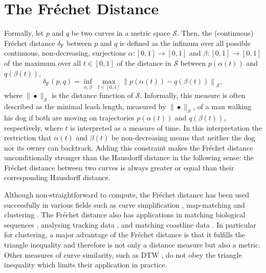 \section{The Fr\'echet Distance}
\label{sec:frechet}
Formally, let $p$ and $q$ be two curves in a metric space $\mathcal{S}$.
Then, the (continuous) Fr\'echet distance $\delta_\mathrm{F}$ between $p$ and $q$ is defined as the infimum over all possible continuous, non-decreasing, surjections $\alpha: [0, 1] \to [0, 1]$ and $\beta: [0, 1] \to [0, 1]$ of the maximum over all $t \in [0, 1]$ of the distance in $\mathcal{S}$ between $p(\alpha(t))$ and $q(\beta(t))$,
\begin{equation*}
    \delta_\mathrm{F}(p, q) = \inf_{\alpha,\beta} \; \max_{t \in [0, 1]} \left\| p(\alpha(t)) - q(\beta(t)) \right\|_\mathcal{S},
\end{equation*}
where $\| \bullet \|_\mathcal{S}$ is the distance function of $\mathcal{S}$.
Informally, this measure is often described as the minimal leash length, measured by $\| \bullet \|_\mathcal{S}$, of a man walking his dog if both are moving on trajectories $p(\alpha(t))$ and $q(\beta(t))$, respectively, where $t$ is interpreted as a measure of time.
In this interpretation the restriction that $\alpha(t)$ and $\beta(t)$ be non-decreasing means that neither the dog nor its owner can backtrack.
Adding this constraint makes the Fr\'echet distance unconditionally stronger than the Hausdorff distance in the following sense: the Fr\'echet distance between two curves is always greater or equal than their corresponding Hausdorff distance.

Although non-straightforward to compute, the Fr\'echet distance has been used successfully in various fields such as curve simplification \citep{agarwal05,bereg08,kreveld18,kerkhof19}, map-matching \citep{alt03a,driemel12,sharma17} and clustering \citep{buchin08b,besse16,buchin19b,buchin19c}.
The Fr\'echet distance also has applications in matching biological sequences \citep{wylie12}, analysing tracking data \citep{brakatsoulas05,buchin08a}, and matching coastline data \citep{mascret06}.
In particular for clustering, a major advantage of the Fr\'echet distance is that it fulfills the triangle inequality and therefore is not only a distance measure but also a metric. 
Other measures of curve similarity, such as DTW \citep{vintsyuk68,sankoff83}, do not obey the triangle inequality which limits their application in practice.

